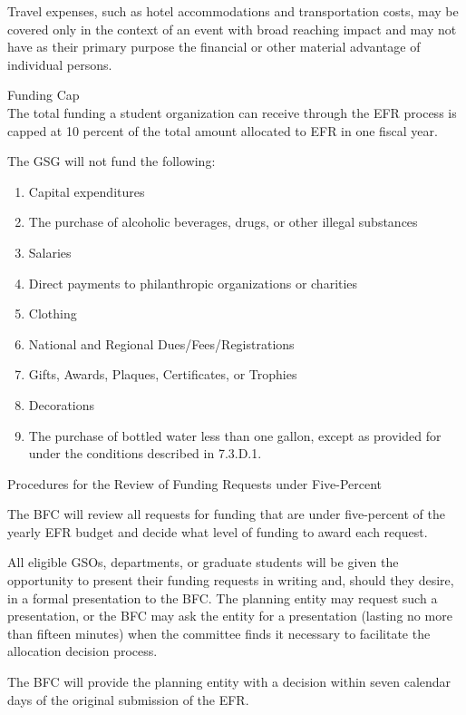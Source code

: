 \begin{bylaws-number}
\begin{bylaws-number}
Travel expenses, such as hotel accommodations and transportation costs, may be covered only in the context of an event with broad reaching impact and may not have as their primary purpose the financial or other material advantage of individual persons.
  \item Funding Cap \hfill \\
  The total funding a student organization can receive through the EFR process is capped at 10 percent of the total amount allocated to EFR in one fiscal year.
  \item The GSG will not fund the following:
\begin{enumerate}[i]
  \item Capital expenditures
  \item The purchase of alcoholic beverages, drugs, or other illegal substances
  \item Salaries
  \item Direct payments to philanthropic organizations or charities
  \item Clothing
  \item National and Regional Dues/Fees/Registrations
  \item Gifts, Awards, Plaques, Certificates, or Trophies
  \item Decorations
  \item The purchase of bottled water less than one gallon, except as provided for under the conditions described in 7.3.D.1.
\end{enumerate}
\end{bylaws-number}
  \item Procedures for the Review of Funding Requests under Five-Percent
\begin{bylaws-number}
  \item The BFC will review all requests for funding that are under five-percent of the yearly EFR budget and decide what level of funding to award each request.
  \item All eligible GSOs, departments, or graduate students will be given the opportunity to present their funding requests in writing and, should they desire, in a formal presentation to the BFC. The planning entity may request such a presentation, or the BFC may ask the entity for a presentation (lasting no more than fifteen minutes) when the committee finds it necessary to facilitate the allocation decision process.
  \item The BFC will provide the planning entity with a decision within seven calendar days of the original submission of the EFR.

\end{bylaws-number}
\end{bylaws-number}
